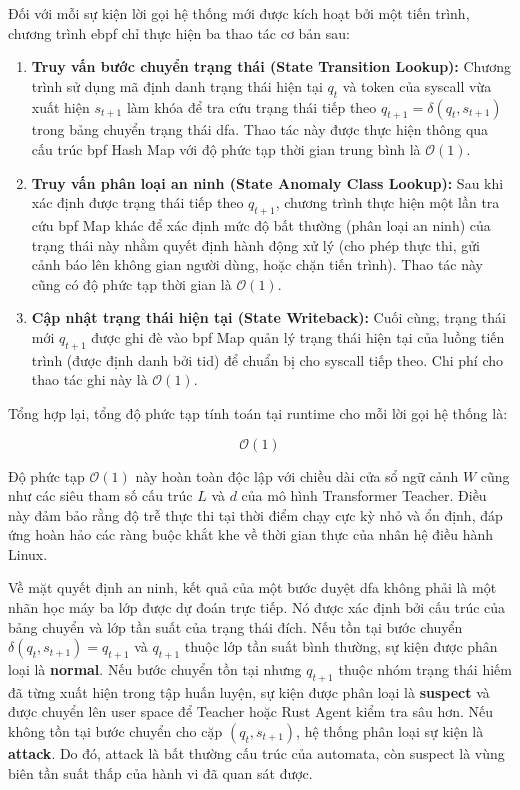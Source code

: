 \documentclass[../main.tex]{subfiles}
\begin{document}
Đối với mỗi sự kiện lời gọi hệ thống mới được kích hoạt bởi một tiến
trình, chương trình \gls{ebpf} chỉ thực hiện ba thao tác cơ bản sau:
\begin{enumerate}
  \item \textbf{Truy vấn bước chuyển trạng thái (State Transition
    Lookup):} Chương trình sử dụng mã định danh trạng thái hiện tại
    $q_t$ và token của \gls{syscall} vừa xuất hiện $s_{t+1}$ làm khóa để
    tra cứu trạng thái tiếp theo $q_{t+1} = \delta(q_t, s_{t+1})$
    trong bảng chuyển trạng thái \gls{dfa}. Thao tác này được thực hiện
    thông qua cấu trúc \gls{bpf} Hash Map với độ phức tạp thời gian trung
    bình là $\mathcal{O}(1)$.
  \item \textbf{Truy vấn phân loại an ninh (State Anomaly Class
    Lookup):} Sau khi xác định được trạng thái tiếp theo $q_{t+1}$,
    chương trình thực hiện một lần tra cứu \gls{bpf} Map khác để xác định
    mức độ bất thường (phân loại an ninh) của trạng thái này nhằm
    quyết định hành động xử lý (cho phép thực thi, gửi cảnh báo lên
    không gian người dùng, hoặc chặn tiến trình). Thao tác này cũng
    có độ phức tạp thời gian là $\mathcal{O}(1)$.
  \item \textbf{Cập nhật trạng thái hiện tại (State Writeback):} Cuối
    cùng, trạng thái mới $q_{t+1}$ được ghi đè vào \gls{bpf} Map quản lý
    trạng thái hiện tại của luồng tiến trình (được định danh bởi
    \gls{tid}) để chuẩn bị cho \gls{syscall} tiếp theo. Chi phí cho
    thao tác ghi này là $\mathcal{O}(1)$.
\end{enumerate}

Tổng hợp lại, tổng độ phức tạp tính toán tại runtime cho mỗi lời gọi
hệ thống là:

\begin{equation}
  \label{eq:dfa_runtime_complexity}
  \mathcal{O}(1)
\end{equation}

Độ phức tạp $\mathcal{O}(1)$ này hoàn toàn độc lập với chiều dài cửa
sổ ngữ cảnh $W$ cũng như các siêu tham số cấu trúc $L$ và $d$ của mô
hình Transformer Teacher. Điều này đảm bảo rằng độ trễ thực thi tại
thời điểm chạy cực kỳ nhỏ và ổn định, đáp ứng hoàn hảo các ràng buộc
khắt khe về thời gian thực của nhân hệ điều hành Linux.

Về mặt quyết định an ninh, kết quả của một bước duyệt \gls{dfa} không phải
là một nhãn học
máy ba lớp được dự đoán trực tiếp. Nó được xác định bởi cấu trúc của
bảng chuyển và lớp
tần suất của trạng thái đích. Nếu tồn tại bước chuyển
$\delta(q_t,s_{t+1})=q_{t+1}$ và
$q_{t+1}$ thuộc lớp tần suất bình thường, sự kiện được phân loại là
\textbf{normal}. Nếu
bước chuyển tồn tại nhưng $q_{t+1}$ thuộc nhóm trạng thái hiếm đã
từng xuất hiện trong
tập huấn luyện, sự kiện được phân loại là \textbf{suspect} và được
chuyển lên user space
để Teacher hoặc Rust Agent kiểm tra sâu hơn. Nếu không tồn tại bước
chuyển cho cặp
$(q_t,s_{t+1})$, hệ thống phân loại sự kiện là \textbf{attack}. Do
đó, attack là bất
thường cấu trúc của automata, còn suspect là vùng biên tần suất thấp
của hành vi đã quan
sát được.
\end{document}
